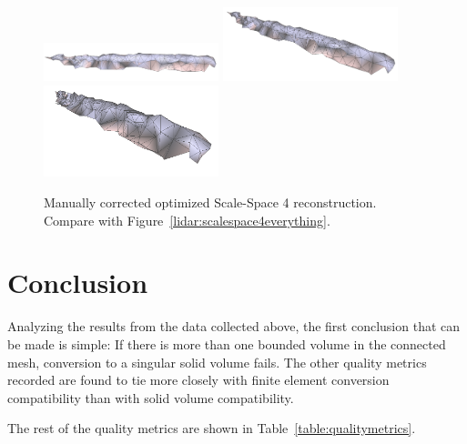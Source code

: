 \documentclass[12pt]{drexelthesis}
\begin{document}
\begin{figure}[!ht]
	\centering
		\includegraphics[width=2in]{real-lab-scans/modmesh/scaleSpace4Modified00.png}
		\includegraphics[width=2in]{real-lab-scans/modmesh/scaleSpace4Modified01.png}
		\includegraphics[width=2in]{real-lab-scans/modmesh/scaleSpace4Modified02.png}
	\caption[Modified optimized surface mesh at Scale-Space 4.]{\centering Manually corrected optimized Scale-Space 4 reconstruction. Compare with Figure~\ref{lidar:scalespace4everything}.}
	\label{real:modified4}
\end{figure}




















\chapter{Conclusion}
\label{chap:conclusion}

Analyzing the results from the data collected above, the first conclusion that can be made is simple: If there is more than one bounded volume in the connected mesh, conversion to a singular solid volume fails. The other quality metrics recorded are found to tie more closely with finite element conversion compatibility than with solid volume compatibility. 

The rest of the quality metrics are shown in Table~\ref{table:qualitymetrics}.
\end{document}

